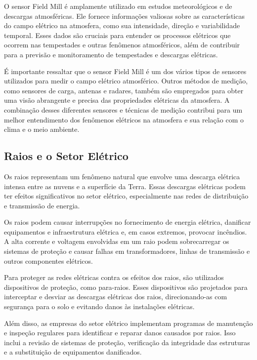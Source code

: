 \documentclass[a4paper, 12pt, onecolumn,singlespacing]{article}
\begin{document}
	O sensor Field Mill é amplamente utilizado em estudos meteorológicos e de descargas atmosféricas. Ele fornece informações valiosas sobre as características do campo elétrico na atmosfera, como	sua intensidade, direção e variabilidade temporal. Esses dados são cruciais para entender os processos elétricos que ocorrem nas tempestades e outras fenômenos atmosféricos, além de contribuir para a previsão e monitoramento de tempestades e descargas elétricas.
	
	É importante ressaltar que o sensor Field Mill é um dos vários tipos de sensores utilizados para medir o campo elétrico atmosférico. Outros métodos de medição, como sensores de carga, antenas e radares, também são empregados para obter uma visão abrangente e precisa das propriedades elétricas da atmosfera. A combinação desses diferentes sensores e técnicas de medição contribui para um melhor entendimento dos fenômenos elétricos na atmosfera e sua relação com o clima e o meio ambiente.
	
	\subsection{Raios e o Setor Elétrico}
	
	Os raios representam um fenômeno natural que envolve uma descarga elétrica intensa entre as nuvens e a superfície da Terra. Essas descargas elétricas podem ter efeitos significativos no setor elétrico, especialmente nas redes de distribuição e transmissão de energia.
	
	Os raios podem causar interrupções no fornecimento de energia elétrica, danificar equipamentos e infraestrutura elétrica e, em casos extremos, provocar incêndios. A alta corrente e voltagem envolvidas em um raio podem sobrecarregar os sistemas de proteção e causar falhas em transformadores, linhas de transmissão e outros componentes elétricos.
	
	Para proteger as redes elétricas contra os efeitos dos raios, são utilizados dispositivos de proteção, como para-raios. Esses dispositivos são projetados para interceptar e desviar as descargas elétricas dos raios, direcionando-as com segurança para o solo e evitando danos às instalações elétricas.
	
	Além disso, as empresas do setor elétrico implementam programas de manutenção e inspeção regulares para identificar e reparar danos causados por raios. Isso inclui a revisão de sistemas de proteção, verificação da integridade das estruturas e a substituição de equipamentos danificados.
	
\end{document}
